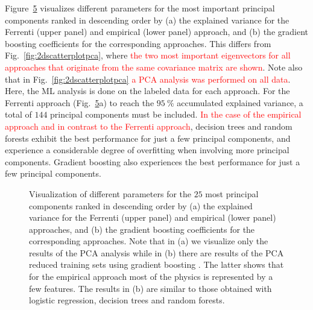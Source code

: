 \documentclass[superscriptaddress,unsortedaddress,
 amsmath,amssymb,
 aps,
]{revtex4-2}
\newcommand{\mrk}[1]{\textcolor{red}{#1}}
\begin{document}
Figure~\ref{fig:PComponents} visualizes different parameters for the most important principal components ranked in descending order by (a) the explained variance for the Ferrenti (upper panel) and empirical (lower panel) approach, and (b) the gradient boosting coefficients for the corresponding approaches. This differs from Fig.~\ref{fig:2dscatterplotpca}, where \mrk{the two most important eigenvectors for all approaches that originate from the same covariance matrix are shown}. Note also that in  Fig.~\ref{fig:2dscatterplotpca} \mrk{a PCA analysis was performed on all data}. Here, the ML analysis is done on the labeled data for each approach. For the Ferrenti approach (Fig.~\ref{fig:PComponents}a) to reach the $95 \ \%$ accumulated explained variance, a total of $144$ principal components must be included. \mrk{In the case of the empirical approach and in contrast to the Ferrenti approach}, decision trees and random forests exhibit the best performance for just a few principal components, and experience a considerable degree of overfitting when involving more principal components. Gradient boosting 
also experiences the best performance for just a few principal components. 

\begin{figure}[t]
    \centering
    \begin{subfigure}[b]{0.45\textwidth}
        
        \label{fig:01-fi-e}
    \end{subfigure}
    \begin{subfigure}[b]{0.45\textwidth}
        
        \label{fig:01-fi-d}
    \end{subfigure}%
    \hfill
    \begin{subfigure}[b]{0.45\textwidth}
        
        \label{fig:03-fi-e}
        \subcaption{}
    \end{subfigure}
    \begin{subfigure}[b]{0.45\textwidth}
        
        \label{fig:03-fi-d}
        \subcaption{}
    \end{subfigure}
    \caption{Visualization of different parameters for the $25$ most principal components ranked in descending order by (a) the explained variance for the Ferrenti (upper panel) and empirical (lower panel) approaches, and (b) the gradient boosting coefficients for the corresponding approaches. Note that in (a) we visualize only the results of the PCA analysis while in (b) there are results of the PCA reduced training sets using gradient boosting \cite{Hastie2009,xgboost2016}. The latter shows that for the empirical approach most of the physics is represented by a few features. The results in (b) are similar to those obtained with logistic regression, decision trees and random forests.  
    }
    \label{fig:PComponents}
\end{figure}
\end{document}
